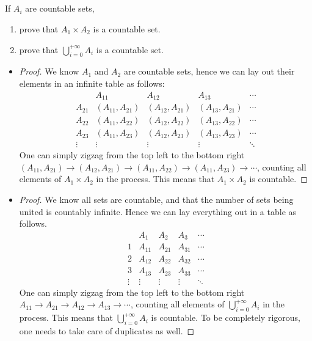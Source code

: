 \subsection{} %
\label{exo:1.1}
If \(A_i\) are countable sets,
\begin{enumerate}
	\item prove that \(A_1 \times A_2\) is a countable set.
	\item prove that \(\bigcup_{i=0}^{+\infty} A_i\)
	is a countable set.
\end{enumerate}

\begin{solution}
	\begin{itemize}
		\item
		\begin{proof}
		We know \(A_1\) and \(A_2\) are countable sets,
		hence we can lay out their elements
		in an infinite table as follows:
		\[
		\begin{array}{c|cccc}
			& A_{11} & A_{12} & A_{13} & \cdots \\
			\hline
			A_{21} & (A_{11}, A_{21}) & (A_{12}, A_{21}) & (A_{13}, A_{21}) & \cdots\\
			A_{22} & (A_{11}, A_{22}) & (A_{12}, A_{22}) & (A_{13}, A_{22}) & \cdots\\
			A_{23} & (A_{11}, A_{23}) & (A_{12}, A_{23}) & (A_{13}, A_{23}) & \cdots\\
			\vdots & \vdots & \vdots & \vdots & \ddots
		\end{array}
		\]
		One can simply zigzag from the top left to the bottom right
		\((A_{11}, A_{21}) \to (A_{12}, A_{21}) \to (A_{11}, A_{22}) \to (A_{11}, A_{23}) \to \cdots\),
		counting all elements of \(A_1 \times A_2\) in the process.
		This means that \(A_1 \times A_2\) is countable.
		\end{proof}
		\item
		\begin{proof}
		We know all sets are countable,
		and that the number of sets being united is countably infinite.
		Hence we can lay everything out in a table as follows.
		\[
		\begin{array}{c|cccc}
			& A_1 & A_2 & A_3 & \cdots \\
			\hline
			1 & A_{11} & A_{21} & A_{31} & \cdots\\
			2 & A_{12} & A_{22} & A_{32} & \cdots\\
			3 & A_{13} & A_{23} & A_{33} & \cdots\\
			\vdots & \vdots & \vdots & \vdots & \ddots
		\end{array}
		\]
		One can simply zigzag from the top left to the bottom right
		\(A_{11} \to A_{21} \to A_{12} \to A_{13} \to \cdots\),
		counting all elements of \(\bigcup_{i=0}^{+\infty} A_i\)
		in the process.
		This means that \(\bigcup_{i=0}^{+\infty} A_i\) is countable.
		To be completely rigorous,
		one needs to take care of duplicates as well.
		\end{proof}
	\end{itemize}
\end{solution}

